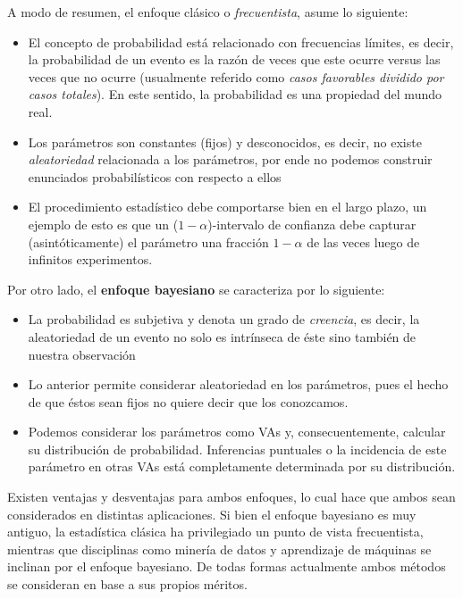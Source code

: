 A modo de resumen, el enfoque clásico o \emph{frecuentista}, asume lo siguiente: 
\begin{itemize}
	\item El concepto de probabilidad está relacionado con frecuencias límites, es decir, la probabilidad de un evento es la razón de veces que este ocurre versus las veces que no ocurre (usualmente referido como \emph{casos favorables dividido por casos totales}). En este sentido, la probabilidad es una propiedad del mundo real. 
	\item Los parámetros son constantes (fijos) y desconocidos, es decir, no existe \emph{aleatoriedad} relacionada a los parámetros, por ende no podemos construir enunciados probabilísticos con respecto a ellos
	\item El procedimiento estadístico debe comportarse bien en el largo plazo, un ejemplo de esto es que un ($1-\alpha$)-intervalo de confianza debe capturar (asintóticamente) el parámetro una fracción $1-\alpha$ de las veces luego de infinitos experimentos. 
\end{itemize}

Por otro lado, el \textbf{enfoque bayesiano} se caracteriza por lo siguiente: 

\begin{itemize}
 	\item La probabilidad es subjetiva y denota un grado de \emph{creencia}, es decir, la aleatoriedad de un evento no solo es intrínseca de éste sino también de nuestra observación
 	\item Lo anterior permite considerar aleatoriedad en los parámetros, pues el hecho de que éstos sean fijos no quiere decir que los conozcamos. 
 	\item Podemos considerar los parámetros como VAs y, consecuentemente, calcular su distribución de probabilidad. Inferencias puntuales o la incidencia de este parámetro en otras VAs está completamente determinada por su distribución.
 \end{itemize}

 Existen ventajas y desventajas para ambos enfoques, lo cual hace que ambos sean considerados en distintas aplicaciones. Si bien el enfoque bayesiano es muy antiguo, la estadística clásica ha privilegiado un punto de vista frecuentista, mientras que disciplinas como minería de datos y aprendizaje de máquinas se inclinan por el enfoque bayesiano. De todas formas actualmente ambos métodos se consideran en base a sus propios méritos. 